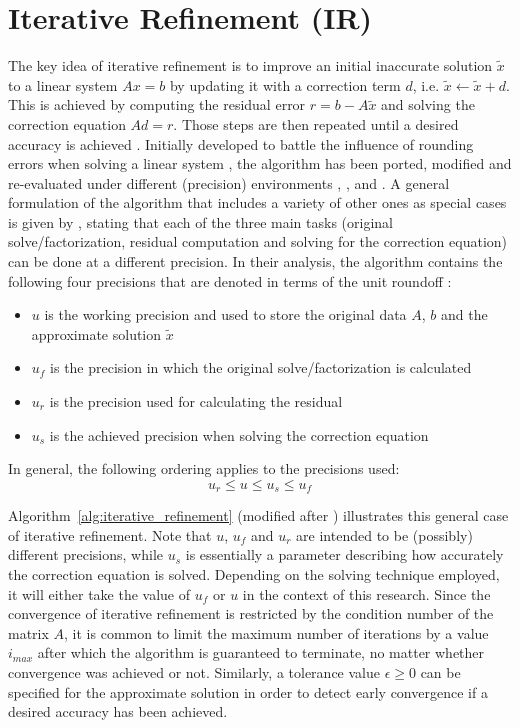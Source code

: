 \chapter{Iterative Refinement (IR)}
\label{chap:iterative_refinement}

The key idea of iterative refinement is to improve an initial inaccurate solution $\tilde{x}$ to a linear system $Ax=b$ by updating it with a correction term $d$, i.e. $\tilde{x}\leftarrow \tilde{x} + d$. This is achieved by computing the residual error $r=b-A\tilde{x}$ and solving the correction equation $Ad=r$. Those steps are then repeated until a desired accuracy is achieved \cite{wilkinson_rounding_1963}. Initially developed to battle the influence of rounding errors when solving a linear system \cite{wilkinson_rounding_1963}, the algorithm has been ported, modified and  re-evaluated under different (precision) environments \cite{moler_iterative_1967}, \cite{skeel_iterative_1980}, \cite{buttari_mixed_2007} and \cite{carson_accelerating_2018}. A general formulation of the algorithm that includes a variety of other ones as special cases is given by \cite{carson_accelerating_2018}, stating that each of the three main tasks (original solve/factorization, residual computation and solving for the correction equation) can be done at a different precision. In  their analysis, the algorithm contains the following four precisions that are denoted in terms of the unit roundoff \cite{carson_accelerating_2018}:
\begin{itemize}
    \item $u$ is the working precision and used to store the original data $A$, $b$ and the approximate solution $\tilde{x}$
    \item $u_f$ is the precision in which the original solve/factorization is calculated
    \item $u_r$ is the precision used for calculating the residual
    \item $u_s$ is the achieved precision when solving the correction equation
\end{itemize}
In general, the following ordering applies to the precisions used:
\begin{equation}
    u_r \leq u \leq u_s \leq u_f
\end{equation}

\noindent Algorithm~\hyperref[alg:iterative_refinement]{\ref{alg:iterative_refinement}} (modified after \cite{carson_new_2017}) illustrates this general case of iterative refinement. Note that $u$, $u_f$ and $u_r$ are intended to be (possibly) different precisions, while $u_s$ is essentially a parameter describing how accurately the correction equation is solved. Depending on the solving technique employed, it will either take the value of $u_f$ or $u$ in the context of this research. Since the convergence of iterative refinement is restricted by the condition number of the matrix $A$, it is common to limit the maximum number of iterations by a value $i_{max}$ after which the algorithm is guaranteed to terminate, no matter whether convergence was achieved or not. Similarly, a tolerance value $\epsilon \geq 0$ can be specified for the approximate solution in order to detect early convergence if a desired accuracy has been achieved.

